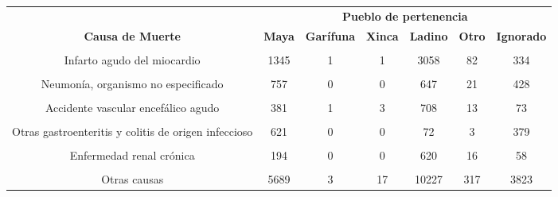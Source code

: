 \begin{tabular}[t]{ccccccc}
\toprule
\multicolumn{1}{c}{\textbf{ }} & \multicolumn{6}{c}{\textbf{Pueblo de pertenencia}} \\
\cmidrule(l{3pt}r{3pt}){2-7}
\textbf{Causa de Muerte} & \textbf{Maya} & \textbf{Garífuna} & \textbf{Xinca} & \textbf{Ladino} & \textbf{Otro} & \textbf{Ignorado}\\
\midrule
\cellcolor[HTML]{B6B3FF}{SARS-CoV2/COVID-19} & \cellcolor[HTML]{B6B3FF}{1048} & \cellcolor[HTML]{B6B3FF}{4} & \cellcolor[HTML]{B6B3FF}{4} & \cellcolor[HTML]{B6B3FF}{4107} & \cellcolor[HTML]{B6B3FF}{91} & \cellcolor[HTML]{B6B3FF}{352}\\
Infarto agudo del miocardio & 1345 & 1 & 1 & 3058 & 82 & 334\\
\cellcolor[HTML]{B6B3FF}{Diabetes mellitus, no especificada} & \cellcolor[HTML]{B6B3FF}{1494} & \cellcolor[HTML]{B6B3FF}{2} & \cellcolor[HTML]{B6B3FF}{7} & \cellcolor[HTML]{B6B3FF}{2785} & \cellcolor[HTML]{B6B3FF}{51} & \cellcolor[HTML]{B6B3FF}{232}\\
Neumonía, organismo no especificado & 757 & 0 & 0 & 647 & 21 & 428\\
\cellcolor[HTML]{B6B3FF}{Diabetes mellitus no insulinodependiente} & \cellcolor[HTML]{B6B3FF}{666} & \cellcolor[HTML]{B6B3FF}{1} & \cellcolor[HTML]{B6B3FF}{1} & \cellcolor[HTML]{B6B3FF}{1051} & \cellcolor[HTML]{B6B3FF}{22} & \cellcolor[HTML]{B6B3FF}{90}\\
Accidente vascular encefálico agudo & 381 & 1 & 3 & 708 & 13 & 73\\
\cellcolor[HTML]{B6B3FF}{Fibrosis y cirrosis del hígado} & \cellcolor[HTML]{B6B3FF}{396} & \cellcolor[HTML]{B6B3FF}{0} & \cellcolor[HTML]{B6B3FF}{2} & \cellcolor[HTML]{B6B3FF}{617} & \cellcolor[HTML]{B6B3FF}{16} & \cellcolor[HTML]{B6B3FF}{57}\\
Otras gastroenteritis y colitis de origen infeccioso & 621 & 0 & 0 & 72 & 3 & 379\\
\cellcolor[HTML]{B6B3FF}{Tumor maligno del hígado y de las vías biliares intrahepáticas} & \cellcolor[HTML]{B6B3FF}{266} & \cellcolor[HTML]{B6B3FF}{0} & \cellcolor[HTML]{B6B3FF}{3} & \cellcolor[HTML]{B6B3FF}{576} & \cellcolor[HTML]{B6B3FF}{12} & \cellcolor[HTML]{B6B3FF}{51}\\
Enfermedad renal crónica & 194 & 0 & 0 & 620 & 16 & 58\\
\cellcolor[HTML]{B6B3FF}{Síntomas, signos y hallazgos anormales clínicos y de laboratorio} & \cellcolor[HTML]{B6B3FF}{2862} & \cellcolor[HTML]{B6B3FF}{2} & \cellcolor[HTML]{B6B3FF}{7} & \cellcolor[HTML]{B6B3FF}{3742} & \cellcolor[HTML]{B6B3FF}{116} & \cellcolor[HTML]{B6B3FF}{889}\\
Otras causas & 5689 & 3 & 17 & 10227 & 317 & 3823\\
\bottomrule
\end{tabular}
